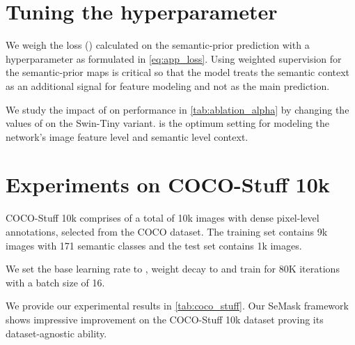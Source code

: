 \documentclass[10pt,twocolumn,letterpaper]{article}
\newcommand{\vspaceundertab}{\vspace{-.2cm}}
\begin{document}
\section{Tuning the hyperparameter }
\label{sec:alpha}

We weigh the loss () calculated on the semantic-prior prediction with a hyperparameter  as formulated in \cref{eq:app_loss}. Using weighted supervision for the semantic-prior maps is critical so that the model treats the semantic context as an additional signal for feature modeling and not as the main prediction.



We study the impact of  on performance in \cref{tab:ablation_alpha} by changing the values of  on the Swin-Tiny variant.  is the optimum setting for modeling the network's image feature level and semantic level context.

\begin{table}[ht]
  \centering
  \vspaceundertab
  \caption{\textbf{Ablation on .} 
        We experiment with different values of  on the SeMask-Tiny variant and report single-scale mIoU~().  is the best setting.}
    \label{tab:ablation_alpha}
\end{table}

 \section{Experiments on COCO-Stuff 10k}
\label{sec:coco}

COCO-Stuff 10k comprises of a total of 10k images with dense pixel-level annotations, selected from the COCO \cite{coco} dataset. The training set contains 9k images with 171 semantic classes and the test set contains 1k images.

We set the base learning rate  to , weight decay to  and train for 80K iterations with a batch size of 16.

We provide our experimental results in \cref{tab:coco_stuff}. Our SeMask framework shows impressive improvement on the COCO-Stuff 10k dataset proving its dataset-agnostic ability.
\end{document}
